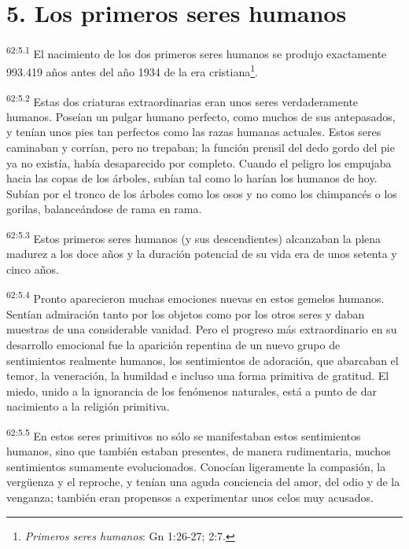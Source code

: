 \section*{5. Los primeros seres humanos}
\par
\textsuperscript{62:5.1} El nacimiento de los dos primeros seres humanos se produjo exactamente 993.419 años antes del año 1934 de la era cristiana\footnote{\textit{Primeros seres humanos}: Gn 1:26-27; 2:7.}.

\par
\textsuperscript{62:5.2} Estas dos criaturas extraordinarias eran unos seres verdaderamente humanos. Poseían un pulgar humano perfecto, como muchos de sus antepasados, y tenían unos pies tan perfectos como las razas humanas actuales. Estos seres caminaban y corrían, pero no trepaban; la función prensil del dedo gordo del pie ya no existía, había desaparecido por completo. Cuando el peligro los empujaba hacia las copas de los árboles, subían tal como lo harían los humanos de hoy. Subían por el tronco de los árboles como los osos y no como los chimpancés o los gorilas, balanceándose de rama en rama.

\par
\textsuperscript{62:5.3} Estos primeros seres humanos (y sus descendientes) alcanzaban la plena madurez a los doce años y la duración potencial de su vida era de unos setenta y cinco años.

\par
\textsuperscript{62:5.4} Pronto aparecieron muchas emociones nuevas en estos gemelos humanos. Sentían admiración tanto por los objetos como por los otros seres y daban muestras de una considerable vanidad. Pero el progreso más extraordinario en su desarrollo emocional fue la aparición repentina de un nuevo grupo de sentimientos realmente humanos, los sentimientos de adoración, que abarcaban el temor, la veneración, la humildad e incluso una forma primitiva de gratitud. El miedo, unido a la ignorancia de los fenómenos naturales, está a punto de dar nacimiento a la religión primitiva.

\par
\textsuperscript{62:5.5} En estos seres primitivos no sólo se manifestaban estos sentimientos humanos, sino que también estaban presentes, de manera rudimentaria, muchos sentimientos sumamente evolucionados. Conocían ligeramente la compasión, la verg\"uenza y el reproche, y tenían una aguda conciencia del amor, del odio y de la venganza; también eran propensos a experimentar unos celos muy acusados.

